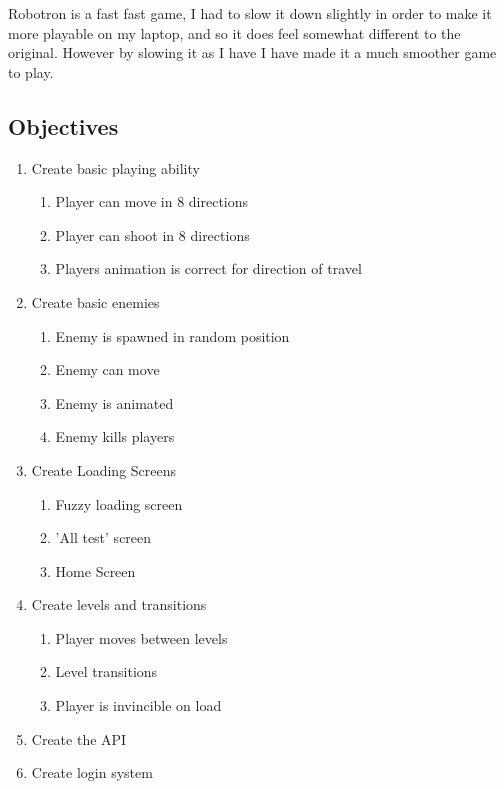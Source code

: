 \documentclass{article}
\begin{document}
Robotron is a fast fast game, I had to slow it down slightly in order to make it more playable on my laptop, and so it does feel somewhat different to the original. However by slowing it as I have I have made it a much smoother game to play.

\subsection{Objectives}
\begin{enumerate}
    \item Create basic playing ability
        \begin{enumerate}
            \item Player can move in 8 directions
            \item Player can shoot in 8 directions
            \item Players animation is correct for direction of travel
        \end{enumerate}
    \item Create basic enemies
        \begin{enumerate}
            \item Enemy is spawned in random position
            \item Enemy can move
            \item Enemy is animated
            \item Enemy kills players
        \end{enumerate}
    \item Create Loading Screens
        \begin{enumerate}
            \item Fuzzy loading screen
            \item 'All test' screen
            \item Home Screen
        \end{enumerate}
    \item Create levels and transitions
        \begin{enumerate}
            \item Player moves between levels
            \item Level transitions
            \item Player is invincible on load
        \end{enumerate}
    \item Create the API
    \item Create login system
        \begin{enumerate}

\end{enumerate}
\end{enumerate}
\end{document}
